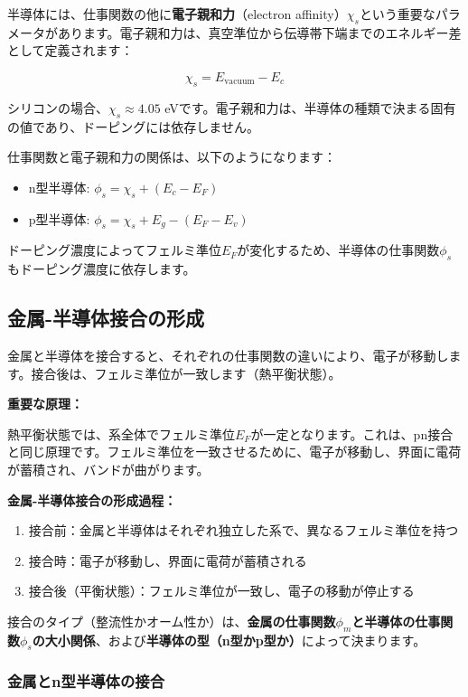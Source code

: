半導体には、仕事関数の他に\textbf{電子親和力}（electron affinity）$\chi_s$という重要なパラメータがあります。電子親和力は、真空準位から伝導帯下端までのエネルギー差として定義されます：

\begin{equation}
\chi_s = E_{\text{vacuum}} - E_c
\end{equation}

シリコンの場合、$\chi_s \approx 4.05$ eVです。電子親和力は、半導体の種類で決まる固有の値であり、ドーピングには依存しません。

仕事関数と電子親和力の関係は、以下のようになります：

\begin{itemize}
\item n型半導体: $\phi_s = \chi_s + (E_c - E_F)$
\item p型半導体: $\phi_s = \chi_s + E_g - (E_F - E_v)$
\end{itemize}

ドーピング濃度によってフェルミ準位$E_F$が変化するため、半導体の仕事関数$\phi_s$もドーピング濃度に依存します。

\subsection{金属-半導体接合の形成}

金属と半導体を接合すると、それぞれの仕事関数の違いにより、電子が移動します。接合後は、フェルミ準位が一致します（熱平衡状態）。

\textbf{重要な原理：}

熱平衡状態では、系全体でフェルミ準位$E_F$が一定となります。これは、pn接合と同じ原理です。フェルミ準位を一致させるために、電子が移動し、界面に電荷が蓄積され、バンドが曲がります。

\textbf{金属-半導体接合の形成過程：}

\begin{enumerate}
\item 接合前：金属と半導体はそれぞれ独立した系で、異なるフェルミ準位を持つ
\item 接合時：電子が移動し、界面に電荷が蓄積される
\item 接合後（平衡状態）：フェルミ準位が一致し、電子の移動が停止する
\end{enumerate}

接合のタイプ（整流性かオーム性か）は、\textbf{金属の仕事関数$\phi_m$と半導体の仕事関数$\phi_s$の大小関係}、および\textbf{半導体の型（n型かp型か）}によって決まります。

\subsubsection{金属とn型半導体の接合}

